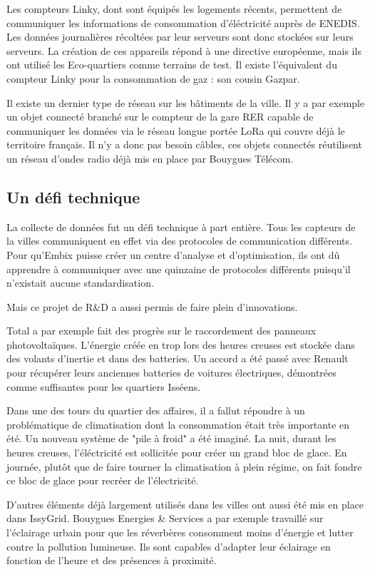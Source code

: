 Les compteurs Linky, dont sont équipés les logements récents, permettent de communiquer les informations
de consommation d'éléctricité auprès de ENEDIS.
Les données journalières récoltées par leur serveurs sont donc stockées sur leurs serveurs.
La création de ces appareils répond à une directive européenne,
mais ils ont utilisé les Eco-quartiers comme terrains de test.
Il existe l'équivalent du compteur Linky pour la consommation de gaz : son cousin Gazpar.

Il existe un dernier type de réseau sur les bâtiments de la ville.
Il y a par exemple un objet connecté branché sur le compteur de la gare RER capable de
communiquer les données via le réseau longue portée LoRa qui couvre déjà le territoire français.
Il n'y a donc pas besoin câbles, ces objets connectés réutilisent un réseau d'ondes radio déjà mis en place par Bouygues Télécom.


\subsection{Un défi technique}

La collecte de données fut un défi technique à part entière.
Tous les capteurs de la villes communiquent en effet via des protocoles de communication différents.
Pour qu'Embix puisse créer un centre d'analyse et d'optimisation, ils ont dû apprendre
à communiquer avec une quinzaine de protocoles différents puisqu'il n'existait aucune standardisation.

Mais ce projet de R\&D a aussi permis de faire plein d'innovations.

Total a par exemple fait des progrès sur le raccordement des panneaux photovoltaïques.
L'énergie créée en trop lors des heures creuses est stockée dans des volants d'inertie et dans des
batteries. Un accord a été passé avec Renault pour récupérer leurs anciennes batteries de voitures
électriques, démontrées comme suffisantes pour les quartiers Isséens.

Dans une des tours du quartier des affaires, il a fallut répondre à un problématique de climatisation
dont la consommation était très importante en été.
Un nouveau système de "pile à froid" a été imaginé.
La nuit, durant les heures creuses, l'éléctricité est sollicitée pour créer un grand bloc de glace.
En journée, plutôt que de faire tourner la climatisation à plein régime, on fait
fondre ce bloc de glace pour recréer de l'électricité.

D'autres éléments déjà largement utilisés dans les villes ont aussi été mis en place dans IssyGrid.
Bouygues Energies \& Services a par exemple travaillé sur l'éclairage urbain pour que les réverbères
consomment moins d'énergie et lutter contre la pollution lumineuse. Ils sont capables d'adapter
leur éclairage en fonction de l'heure et des présences à proximité.

